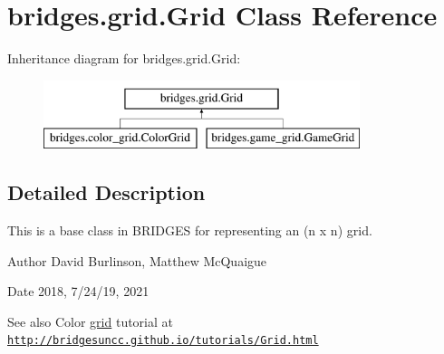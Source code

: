 \hypertarget{classbridges_1_1grid_1_1_grid}{}\section{bridges.\+grid.\+Grid Class Reference}
\label{classbridges_1_1grid_1_1_grid}
Inheritance diagram for bridges.\+grid.\+Grid\+:\begin{figure}[H]
\begin{center}
\leavevmode
\includegraphics[height=2.000000cm]{classbridges_1_1grid_1_1_grid}
\end{center}
\end{figure}


\subsection{Detailed Description}
This is a base class in B\+R\+I\+D\+G\+ES for representing an (n x n) grid. 

\begin{DoxyAuthor}{Author}
David Burlinson, Matthew Mc\+Quaigue
\end{DoxyAuthor}
\begin{DoxyDate}{Date}
2018, 7/24/19, 2021
\end{DoxyDate}
\begin{DoxySeeAlso}{See also}
Color \hyperlink{namespacebridges_1_1grid}{grid} tutorial at \href{http://bridgesuncc.github.io/tutorials/Grid.html}{\tt http\+://bridgesuncc.\+github.\+io/tutorials/\+Grid.\+html} 
\end{DoxySeeAlso}
